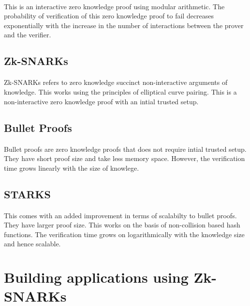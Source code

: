 \documentclass[12pt]{article}
\theoremstyle{definition}
\theoremstyle{remark}
\theoremstyle{definition}
\begin{document}
\paragraph*{}
\text This is an interactive zero knowledge proof using modular arithmetic. The probability of verification of this zero knowledge proof to fail decreases exponentially with the increase in the number of interactions between the prover and the verifier.

\subsection{Zk-SNARKs}
\paragraph*{}
\text Zk-SNARKs refers to zero knowledge succinct non-interactive arguments of knowledge. This works using the principles of elliptical curve pairing. This is a non-interactive zero knowledge proof with an intial trusted setup.

\subsection{Bullet Proofs}
\paragraph*{}
\text Bullet proofs are zero knowledge proofs that does not require intial trusted setup. They have short proof size and take less memory space. However, the verification time grows linearly with the size of knowlege.



\subsection{STARKS}
\paragraph*{}
\text This comes with an added improvement in terms of scalabilty to bullet proofs. They have larger proof size. This works on the basis of non-collision based hash functions. The verification time grows on logarithmically with the knowledge size and hence scalable.




\newpage


\section{Building applications using Zk-SNARKs}
\end{document}
